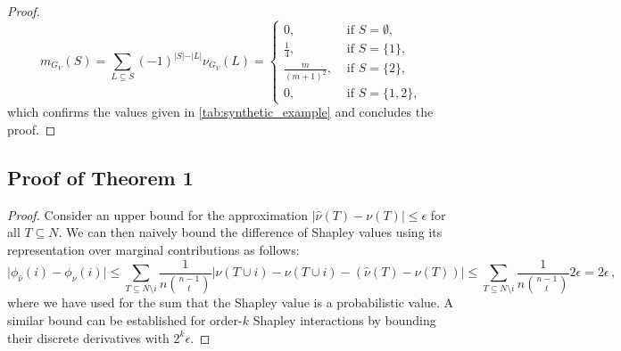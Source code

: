 \documentclass[letterpaper]{article} %
\begin{document}
\begin{proof}
\[
 m_{G_V}(S) =\sum_{L \subseteq S}(-1)^{\vert S \vert - \vert L \vert} \nu_{G_V}(L) = 
        \begin{cases}
        0, &\text{ if } S = \emptyset, \\
        \frac{1}{4}, &\text{ if } S = \{1\}, \\
        \frac{m}{(m+1)^2}, &\text{ if } S = \{2\}, \\
        0, &\text{ if } S=\{1,2\},
        \end{cases}
\]
which confirms the values given in \cref{tab:synthetic_example} and concludes the proof.
\end{proof}



\subsection{Proof of Theorem 1}\label{apx:proof-error-bound}
\begin{proof}
Consider an upper bound for the approximation $\vert \hat\nu(T) - \nu(T) \vert \leq \epsilon$ for all $T \subseteq N$. We can then naively bound the difference of Shapley values using its representation over marginal contributions as follows: 
\[
\vert \phi_{\hat\nu}(i) - \phi_{\nu}(i) \vert \leq \sum_{T \subseteq N \setminus i} \frac{1}{n\binom{n-1}{t}}\vert\hat\nu(T \cup i)-\nu(T\cup i) - (\hat\nu(T) - \nu(T))\vert \leq \sum_{T \subseteq N \setminus i} \frac{1}{n\binom{n-1}{t}}2 \epsilon = 2\epsilon \, ,
\]
where we have used for the sum that the Shapley value is a probabilistic value. A similar bound can be established for order-$k$ Shapley interactions by bounding their discrete derivatives with $2^k \epsilon$.
\end{proof}
\end{document}
